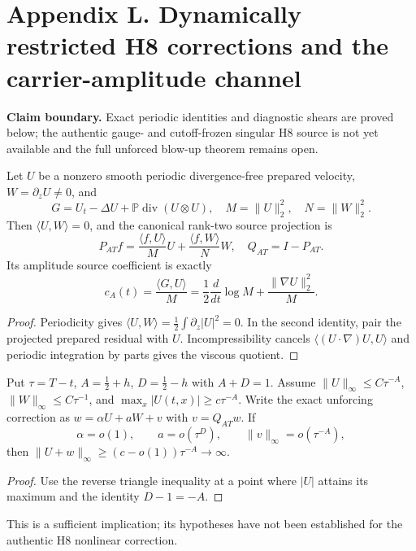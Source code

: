 \clearpage
\section*{Appendix L. Dynamically restricted H8 corrections and the carrier-amplitude channel}
\noindent\textbf{Claim boundary.} Exact periodic identities and diagnostic shears are proved below; the authentic gauge- and cutoff-frozen singular H8 source is not yet available and the full unforced blow-up theorem remains open.

\begin{proposition}
Let $U$ be a nonzero smooth periodic divergence-free prepared velocity, $W=\partial_zU\ne0$, and
\[
G=U_t-\Delta U+\mathbb P\operatorname{div}(U\otimes U),
\quad M=\|U\|_2^2,\quad N=\|W\|_2^2.
\]
Then $\langle U,W\rangle=0$, and the canonical rank-two source projection is
\[
\boxed{P_{AT}f=\frac{\langle f,U\rangle}{M}U+
\frac{\langle f,W\rangle}{N}W,\quad Q_{AT}=I-P_{AT}.}
\]
Its amplitude source coefficient is exactly
\[
\boxed{\quad c_A(t)=\frac{\langle G,U\rangle}{M}
=\frac12\frac{d}{dt}\log M+\frac{\|\nabla U\|_2^2}{M}.\quad}
\]
\end{proposition}
\begin{proof}
Periodicity gives $\langle U,W\rangle=\frac12\int\partial_z|U|^2=0$.
In the second identity, pair the projected prepared residual with $U$.
Incompressibility cancels $\langle (U\cdot\nabla)U,U\rangle$ and
periodic integration by parts gives the viscous quotient.
\end{proof}

\begin{theorem}
Put $\tau=T-t$, $A=\frac12+h$, $D=\frac12-h$ with $A+D=1$.
Assume $\|U\|_\infty\le C\tau^{-A}$,
$\|W\|_\infty\le C\tau^{-1}$, and
$\max_x|U(t,x)|\ge c\tau^{-A}$.
Write the exact unforcing correction as
$w=\alpha U+aW+v$ with $v=Q_{AT}w$.
If
\[
\boxed{\alpha=o(1),\qquad a=o(\tau^D),\qquad
\|v\|_\infty=o(\tau^{-A}),}
\]
then $\|U+w\|_\infty\ge(c-o(1))\tau^{-A}\to\infty$.
\end{theorem}
\begin{proof}
Use the reverse triangle inequality at a point where $|U|$ attains
its maximum and the identity $D-1=-A$.
\end{proof}
\noindent This is a sufficient implication; its hypotheses have not
been established for the authentic H8 nonlinear correction.

